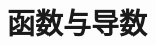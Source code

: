 \documentclass[../main.tex]{subfiles} %
\begin{document}
\chapter{函数与导数}



% 

% 

% 

% 

% 

% 

% 

% 

% 
\end{document}
